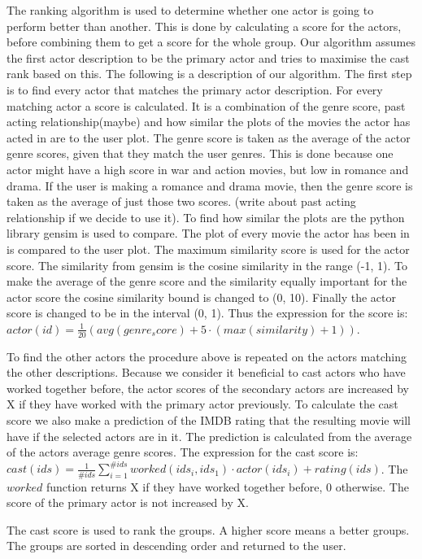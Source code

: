 The ranking algorithm is used to determine whether one actor is going to perform better than another. This is done by calculating a score for the actors, before combining them to get a score for the whole group. Our algorithm assumes the first actor description to be the primary actor and tries to maximise the cast rank based on this. The following is a description of our algorithm. The first step is to find every actor that matches the primary actor description. For every matching actor a score is calculated. It is a combination of the genre score, past acting relationship(maybe) and how similar the plots of the movies the actor has acted in are to the user plot. The genre score is taken as the average of the actor genre scores, given that they match the user genres. This is done because one actor might have a high score in war and action movies, but low in romance and drama. If the user is making a romance and drama movie, then the genre score is taken as the average of just those two scores. (write about past acting relationship if we decide to use it). To find how similar the plots are the python library gensim is used to compare. The plot of every movie the actor has been in is compared to the user plot. The maximum similarity score is used for the actor score. The similarity from gensim is the cosine similarity in the range (-1, 1). To make the average of the genre score and the similarity equally important for the actor score the cosine similarity bound is changed to (0, 10). Finally the actor score is changed to be in the interval (0, 1). Thus the expression for the score is: $actor(id)=\frac{1}{20}(avg(genre_score) + 5\cdot(max(similarity)+1))$.

To find the other actors the procedure above is repeated on the actors matching the other descriptions. Because we consider it beneficial to cast actors who have worked together before, the actor scores of the secondary actors are increased by X if they have worked with the primary actor previously. To calculate the cast score we also make a prediction of the IMDB rating that the resulting movie will have if the selected actors are in it. The prediction is calculated from the average of the actors average genre scores. The expression for the cast score is: $cast(ids)=\frac{1}{\#ids}\sum_{i=1}^{\#ids}worked(ids_i, ids_1)\cdot actor(ids_i) + rating(ids)$. The $worked$ function returns X if they have worked together before, 0 otherwise. The score of the primary actor is not increased by X.

The cast score is used to rank the groups. A higher score means a better groups. The groups are sorted in descending order and returned to the user.